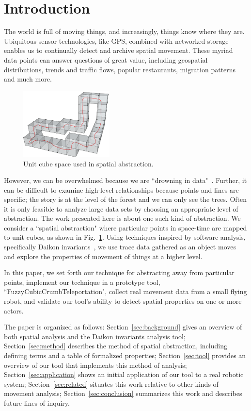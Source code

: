 \section{Introduction}

The world is full of moving things, and increasingly, things know where they are. 
Ubiquitous sensor technologies, like GPS, combined with networked storage enables us to continually detect and archive spatial movement.
These myriad data points can answer questions of great value, including geospatial distributions, trends and traffic flows, popular restaurants, migration patterns and much more.

\begin{figure}
  \centering
  \includegraphics[width=0.42\textwidth]{./figures/path_overview}
  \caption{Unit cube space used in spatial abstraction.}
  \label{fig:unitCubes}
\end{figure}

However, we can be overwhelmed because we are ``drowning in data"~\cite{morse1993drowning}.
Further, it can be difficult to examine high-level relationships because points and lines are specific; the story is at the level of the forest and we can only see the trees.  
Often it is only feasible to analyze large data sets by choosing an appropriate level of abstraction.
The work presented here is about one such kind of abstraction.
We consider a ``spatial abstraction" where particular points in space-time are mapped to unit cubes, as shown in Fig.~\ref{fig:unitCubes}.
Using techniques inspired by software analysis, specifically Daikon invariants~\cite{kataoka2001automated}, we use trace data gathered as an object moves and explore the properties of movement of things at a higher level.

In this paper, we set forth our technique for abstracting away from particular points, 
implement our technique in a prototype tool, ``FuzzyCubicCrumbTeleportation", 
collect real movement data from a small flying robot, 
and validate our tool's ability to detect spatial properties on one or more actors.

The paper is organized as follows:
Section~\ref{sec:background} gives an overview of both spatial analysis and the Daikon invariants analysis tool;
Section~\ref{sec:method} describes the method of spatial abstraction, including defining terms and a table of formalized properties;
Section~\ref{sec:tool} provides an overview of our tool that implements this method of analysis;
Section~\ref{sec:application} shows an initial application of our tool to a real robotic system;
Section~\ref{sec:related} situates this work relative to other kinds of movement analysis;
Section~\ref{sec:conclusion} summarizes this work and describes future lines of inquiry. 




